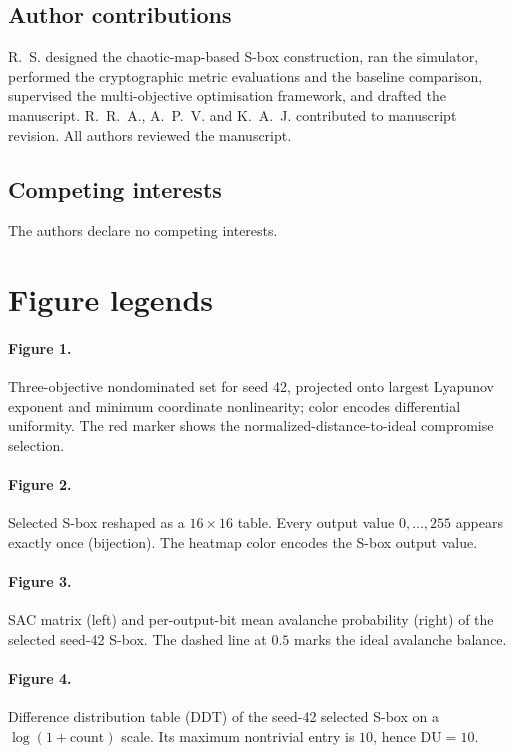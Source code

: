 \documentclass[11pt,a4paper]{article}
\begin{document}
\subsection*{Author contributions}
R.~S. designed the chaotic-map-based S-box construction, ran the simulator,
performed the cryptographic metric evaluations and the baseline comparison,
supervised the multi-objective optimisation framework, and drafted the
manuscript. R.~R.~A., A.~P.~V. and K.~A.~J. contributed to manuscript revision.
All authors reviewed the manuscript.

\subsection*{Competing interests}
The authors declare no competing interests.

\section*{Figure legends}

\paragraph{Figure 1.} Three-objective nondominated set for seed 42,
projected onto largest Lyapunov exponent and minimum coordinate
nonlinearity; color encodes differential uniformity. The red marker
shows the normalized-distance-to-ideal compromise selection.

\paragraph{Figure 2.} Selected S-box reshaped as a $16 \times 16$
table. Every output value $0,\ldots,255$ appears exactly once
(bijection). The heatmap color encodes the S-box output value.

\paragraph{Figure 3.} SAC matrix (left) and per-output-bit mean
avalanche probability (right) of the selected seed-42 S-box. The
dashed line at $0.5$ marks the ideal avalanche balance.

\paragraph{Figure 4.} Difference distribution table (DDT) of the
seed-42 selected S-box on a $\log(1 + \mathrm{count})$ scale. Its
maximum nontrivial entry is $10$, hence $\mathrm{DU}=10$.
\end{document}
